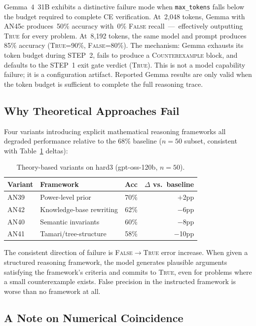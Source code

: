 \documentclass[11pt]{article}
\begin{document}
Gemma~4~31B exhibits a distinctive failure mode when \texttt{max\_tokens}
falls below the budget required to complete CE verification. At~2{,}048
tokens, Gemma with AN45c produces~50\% accuracy with~0\%
\textsc{False} recall~---~effectively outputting \textsc{True} for
every problem. At~8{,}192 tokens, the same model and prompt produces
85\% accuracy (\textsc{True}=90\%, \textsc{False}=80\%). The mechanism:
Gemma exhausts its token budget during STEP~2, fails to produce a
\textsc{Counterexample} block, and defaults to the STEP~1 exit gate
verdict (\textsc{True}). This is not a model capability failure; it is
a configuration artifact. Reported Gemma results are only valid when
the token budget is sufficient to complete the full reasoning trace.

\subsection{Why Theoretical Approaches Fail}

Four variants introducing explicit mathematical reasoning frameworks all
degraded performance relative to the 68\% baseline ($n=50$ subset,
consistent with Table~\ref{tab:theory} deltas):

\begin{table}[h]
\centering
\caption{Theory-based variants on hard3 (gpt-oss-120b, $n=50$).}
\label{tab:theory}
\begin{tabular}{llrr}
\toprule
Variant & Framework & Acc & $\Delta$ vs.\ baseline \\
\midrule
AN39 & Power-level prior       & 70\% & $+$2pp \\
AN42 & Knowledge-base rewriting & 62\% & $-$6pp \\
AN40 & Semantic invariants      & 60\% & $-$8pp \\
AN41 & Tamari/tree-structure    & 58\% & $-$10pp \\
\bottomrule
\end{tabular}
\end{table}

The consistent direction of failure is \textsc{False}$\to$\textsc{True}
error increase. When given a structured reasoning framework, the model
generates plausible arguments satisfying the framework's criteria and
commits to \textsc{True}, even for problems where a small
counterexample exists. False precision in the instructed framework is
worse than no framework at all.

\subsection{A Note on Numerical Coincidence}
\end{document}
